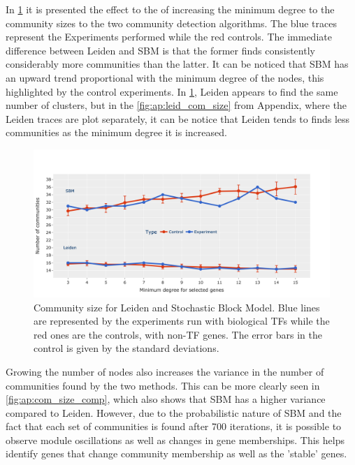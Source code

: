 In \cref{fig:N_I:comp_size_com_det} it is presented the effect to the of increasing the minimum degree to the community sizes to the two community detection algorithms. The blue traces represent the Experiments performed while the red controls. The immediate difference between Leiden and SBM is that the former finds consistently considerably more communities than the latter. It can be noticed that SBM has an upward trend proportional with the minimum degree of the nodes, this highlighted by the control experiments. In \cref{fig:N_I:comp_size_com_det}, Leiden appears to find the same number of clusters, but in the \cref{fig:ap:leid_com_size} from Appendix, where the Leiden traces are plot separately, it can be notice that Leiden tends to finds less communities as the minimum degree it is increased. 

\begin{figure}[!htb]   
\centering
\includegraphics[width=1.0\textwidth,height=1.0\textheight,keepaspectratio]{Sections/Network_I/Resources/selective_pruning/sbm_Leiden_combNum.png}
  \caption{Community size for Leiden and Stochastic Block Model. Blue lines are represented by the experiments run with biological TFs while the red ones are the controls, with non-TF genes. The error bars in the control is given by the standard deviations.}
\label{fig:N_I:comp_size_com_det}
\end{figure}

Growing the number of nodes also increases the variance in the number of communities found by the two methods. This can be more clearly seen in \cref{fig:ap:com_size_comp}, which also shows that SBM has a higher variance compared to Leiden. However, due to the probabilistic nature of SBM and the fact that each set of communities is found after 700 iterations, it is possible to observe module oscillations as well as changes in gene memberships. This helps identify genes that change community membership as well as the 'stable' genes.

